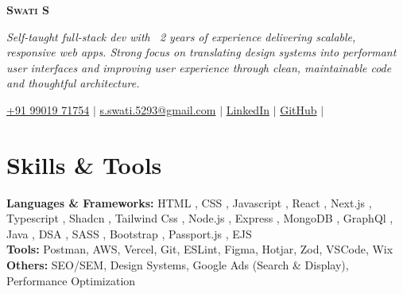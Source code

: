 \documentclass[letterpaper,11pt]{article}
\newcommand{\resumeSubHeadingListStart}{\begin{itemize}[leftmargin=0.15in, label={}]}
\newcommand{\resumeSubHeadingListEnd}{\end{itemize}}
\begin{document}

\begin{center}
  \textbf{\LARGE \scshape Swati S} 
\end{center}
\vspace{2pt}
 \noindent
\begin{minipage}{\textwidth}
  \footnotesize \textit{
    Self-taught full-stack dev with ~2 years of experience delivering scalable, responsive web apps. Strong focus on translating design systems into performant user interfaces and improving user experience through clean, maintainable code and thoughtful architecture.
  }
\end{minipage}

\vspace{2pt}
\begin{center}
  \small
   \faMobile \hspace{.5pt} \href{tel:+919901971754}{+91 99019 71754}
  $|$
  \faAt \hspace{.5pt} \href{mailto:s.swati.5293@gmail.com}{s.swati.5293@gmail.com}
  $|$
  \faLinkedinSquare \hspace{.5pt} \href{https://www.linkedin.com/in/swatis1/}{LinkedIn}
  $|$
  \faGithub \hspace{.5pt} \href{https://github.com/sswadi}{GitHub}
  $|$
  \faMapMarker \hspace{.5pt}{B'lore, India}
\end{center}


\section{Skills \& Tools}
\vspace{2pt}
\resumeSubHeadingListStart
\small{\item{
              \textbf{Languages \& Frameworks:}{ HTML , CSS , Javascript , React , Next.js , Typescript , Shadcn , Tailwind Css , Node.js , Express , MongoDB , GraphQl , Java , DSA , SASS , Bootstrap , Passport.js , EJS} \\ \vspace{2pt}
              \textbf{Tools:} Postman, AWS, Vercel, Git, ESLint, Figma, Hotjar, Zod, VSCode, Wix\\ \vspace{2pt}
              \textbf{Others:} SEO/SEM, Design Systems, Google Ads (Search \& Display), Performance Optimization
}}
\resumeSubHeadingListEnd
\end{document}
